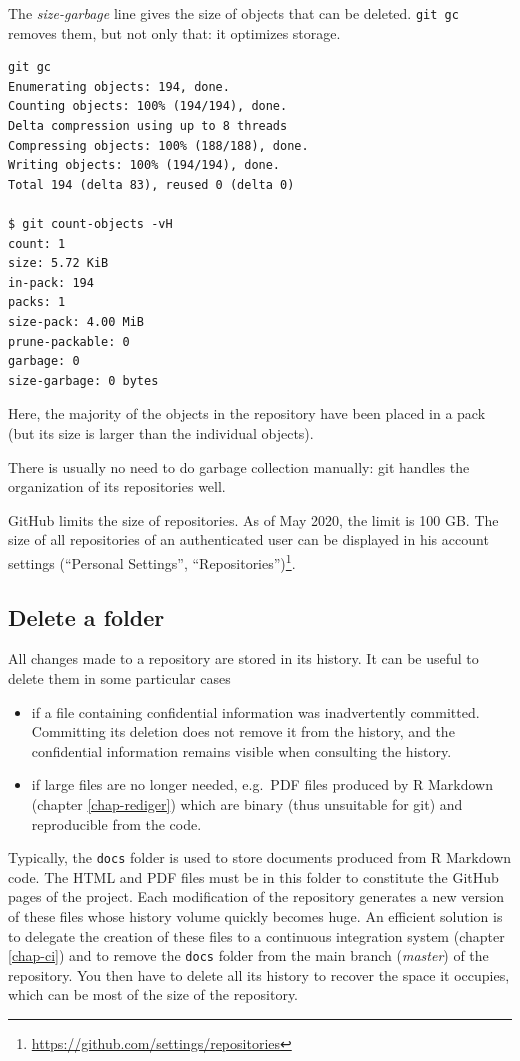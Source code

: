 \documentclass[
  12pt,
  american,
  a4paper,
  extrafontsizes,onecolumn,openright
  ]{memoir}
\providecommand{\tightlist}{%
  \setlength{\itemsep}{0pt}\setlength{\parskip}{0pt}}
\begin{document}
The \emph{size-garbage} line gives the size of objects that can be deleted.
\texttt{git\ gc} removes them, but not only that: it optimizes storage.

\begin{verbatim}
git gc
Enumerating objects: 194, done.
Counting objects: 100% (194/194), done.
Delta compression using up to 8 threads
Compressing objects: 100% (188/188), done.
Writing objects: 100% (194/194), done.
Total 194 (delta 83), reused 0 (delta 0)

$ git count-objects -vH
count: 1
size: 5.72 KiB
in-pack: 194
packs: 1
size-pack: 4.00 MiB
prune-packable: 0
garbage: 0
size-garbage: 0 bytes
\end{verbatim}

Here, the majority of the objects in the repository have been placed in a pack (but its size is larger than the individual objects).

There is usually no need to do garbage collection manually: git handles the organization of its repositories well.

GitHub limits the size of repositories.
As of May 2020, the limit is 100 GB.
The size of all repositories of an authenticated user can be displayed in his account settings (\enquote{Personal Settings}, \enquote{Repositories})\footnote{\url{https://github.com/settings/repositories}}.

\subsection{Delete a folder}\label{delete-a-folder}

All changes made to a repository are stored in its history.
It can be useful to delete them in some particular cases

\begin{itemize}
\tightlist
\item
  if a file containing confidential information was inadvertently committed.
  Committing its deletion does not remove it from the history, and the confidential information remains visible when consulting the history.
\item
  if large files are no longer needed, e.g.~PDF files produced by R Markdown (chapter \ref{chap-rediger}) which are binary (thus unsuitable for git) and reproducible from the code.
\end{itemize}

Typically, the \texttt{docs} folder is used to store documents produced from R Markdown code.
The HTML and PDF files must be in this folder to constitute the GitHub pages of the project.
Each modification of the repository generates a new version of these files whose history volume quickly becomes huge.
An efficient solution is to delegate the creation of these files to a continuous integration system (chapter \ref{chap-ci}) and to remove the \texttt{docs} folder from the main branch (\emph{master}) of the repository.
You then have to delete all its history to recover the space it occupies, which can be most of the size of the repository.
\end{document}
